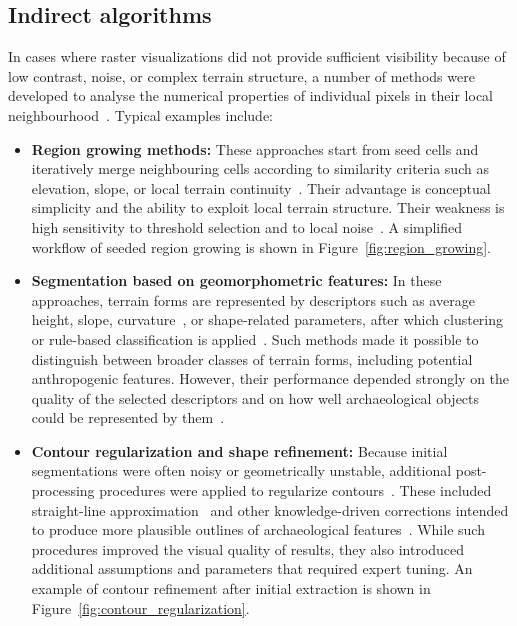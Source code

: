 \subsection{Indirect algorithms}
In cases where raster visualizations did not provide sufficient visibility because of low contrast, noise, or complex terrain structure, a number of methods were developed to analyse the numerical properties of individual pixels in their local neighbourhood~\cite{MILIARESIS20071076}. Typical examples include:

\begin{itemize}
    \item \textbf{Region growing methods:} These approaches start from seed cells and iteratively merge neighbouring cells according to similarity criteria such as elevation, \gls{slope}, or local terrain continuity~\cite{adams_seeded_1994,MILIARESIS20071076,zhu_loess_2018}. Their advantage is conceptual simplicity and the ability to exploit local terrain structure. Their weakness is high sensitivity to threshold selection and to local noise~\cite{adams_seeded_1994,castilla_size-constrained_nodate}. A simplified workflow of seeded region growing is shown in Figure~\ref{fig:region_growing}.

    \item \textbf{Segmentation based on geomorphometric features:} In these approaches, terrain forms are represented by descriptors such as average height, \gls{slope}, curvature~\cite{evans_geomorphometry_2012}, or shape-related parameters, after which clustering or rule-based classification is applied~\cite{MILIARESIS20071076,zhu_loess_2018}. Such methods made it possible to distinguish between broader classes of terrain forms, including potential anthropogenic features. However, their performance depended strongly on the quality of the selected descriptors and on how well archaeological objects could be represented by them~\cite{MILIARESIS20071076}.

    \item \textbf{Contour regularization and shape refinement:} Because initial segmentations were often noisy or geometrically unstable, additional post-processing procedures were applied to regularize contours~\cite{liow_use_1990}. These included straight-line approximation~\cite{douglas_algorithms_1973} and other knowledge-driven corrections intended to produce more plausible outlines of archaeological features~\cite{liow_use_1990,HUERTAS1988131}. While such procedures improved the visual quality of results, they also introduced additional assumptions and parameters that required expert tuning. An example of contour refinement after initial extraction is shown in Figure~\ref{fig:contour_regularization}.

\end{itemize}

